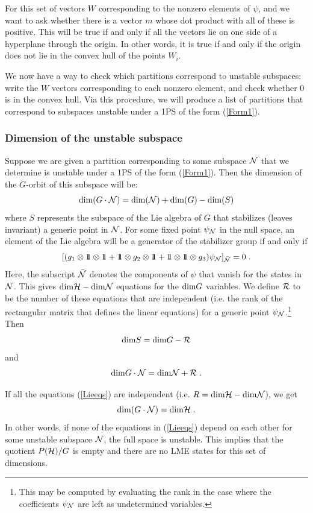 \documentclass[12pt]{article}
\theoremstyle{definition}
\newcommand{\be}{\begin{equation}}
\newcommand{\ee}{\end{equation}}
\def\identity{{\rlap{1} \hskip 1.6pt \hbox{1}}}
\begin{document}
For this set of vectors $W$ corresponding to the nonzero elements of $\psi$, and we want to ask whether there is a vector $m$ whose dot product with all of these is positive. This will be true if and only if all the vectors lie on one side of a hyperplane through the origin. In other words, it is true if and only if the origin does not lie in the convex hull of the points $W_i$.

We now have a way to check which partitions correspond to unstable subspaces: write the $W$ vectors corresponding to each nonzero element, and check whether 0 is in the convex hull. Via this procedure, we will produce a list of partitions that correspond to subspaces unstable under a 1PS of the form (\ref{Form1}).

\subsubsection*{Dimension of the unstable subspace}

Suppose we are given a partition corresponding to some subspace ${\cal N}$ that we determine is unstable under a 1PS of the form (\ref{Form1}). Then the dimension of the $G$-orbit of this subspace will be:
\be
\label{dimensions}
{\rm dim}( G \cdot {\cal N}) = {\rm dim}({\cal N}) + {\rm dim}(G) - {\rm dim}(S)
\ee
where $S$ represents the subspace of the Lie algebra of $G$ that stabilizes (leaves invariant) a generic point in ${\cal N}$. For some fixed point $\psi_{\cal N}$ in the null space, an element of the Lie algebra will be a generator of the stabilizer group if and only if
\be
\label{Lieeqs}
[(g_1 \otimes \identity \otimes \identity + \identity \otimes g_2 \otimes \identity + \identity \otimes \identity \otimes g_3 ) \psi_{\cal N} ]_{\bar{\cal N}} = 0 \; .
\ee
Here, the subscript $\bar{\cal N}$ denotes the components of $\psi$ that vanish for the states in ${\cal N}$. This gives ${\rm dim}{\cal H} - {\rm dim} {\cal N}$ equations for the ${\rm dim}G$ variables. We define ${\cal R}$ to be the number of these equations that are independent (i.e. the rank of the rectangular matrix that defines the linear equations) for a generic point $\psi_{\cal N}$.\footnote{This may be computed by evaluating the rank in the case where the coefficients $\psi_{\cal N}$ are left as undetermined variables.} Then
\be
{\rm dim} S = {\rm dim}G - {\cal R}
\ee
and
\be
{\rm dim} G \cdot {\cal N} = {\rm dim} {\cal N} + {\cal R} \; .
\ee

If all the equations (\ref{Lieeqs}) are independent (i.e. $R = {\rm dim}{\cal H} - {\rm dim} {\cal N}$), we get
\be
{\rm dim} (G \cdot {\cal N}) = {\rm dim}{\cal H} \; .
\ee
In other words, if none of the equations in (\ref{Lieeqs}) depend on each other for some unstable subspace ${\cal N}$, the full space is unstable. This implies that the quotient $P({\cal H})/G$ is empty and there are no LME states for this set of dimensions.
\end{document}
